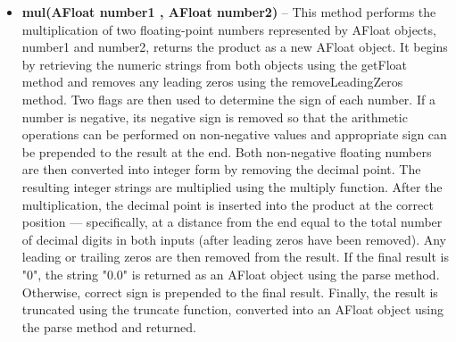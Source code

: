 \documentclass[a4paper,12pt]{article}
\begin{document}
{\begin{itemize}
    \item \textbf{mul(AFloat number1 , AFloat number2)} -- This method performs the multiplication of two floating-point numbers represented by AFloat objects, number1 and number2, returns the product as a new AFloat object. It begins by retrieving the numeric strings from both objects using the getFloat method and removes any leading zeros using the removeLeadingZeros method. Two flags are then used to determine the sign of each number. If a number is negative, its negative sign is removed so that the arithmetic operations can be performed on non-negative values and appropriate sign can be prepended to the result at the end. Both non-negative floating numbers are then converted into integer form by removing the decimal point. The resulting integer strings are multiplied using the multiply function. After the multiplication, the decimal point is inserted into the product at the correct position — specifically, at a distance from the end equal to the total number of decimal digits in both inputs (after leading zeros have been removed). Any leading or trailing zeros are then removed from the result. If the final result is "0", the string "0.0" is returned as an AFloat object using the parse method. Otherwise, correct sign is prepended to the final result. Finally, the result is truncated using the truncate function, converted into an AFloat object using the parse method and returned.\\ 


\end{itemize}}
\end{document}

